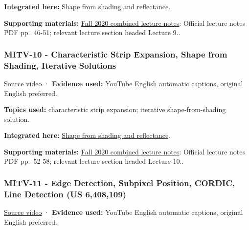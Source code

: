 \textbf{Integrated here:} \hyperref[04-visual-computing-ii-ch032-shape-from-shading-and-reflectance]{Shape from shading and reflectance}.

\textbf{Supporting materials:} \href{https://ocw.mit.edu/courses/6-801-machine-vision-fall-2020/9ec44f69e72995c370b3797818ba01e6_MIT6_801F20_lectureNotes.pdf}{Fall 2020 combined lecture notes}: Official lecture notes PDF pp.~46-51; relevant lecture section headed Lecture 9..

\subsubsection{MITV-10 - Characteristic Strip Expansion, Shape from Shading, Iterative Solutions}\label{04-visual-computing-ii-ch036-mitv-10---characteristic-strip-expansion-shape-from-shading-iterative-solutions}

\hypertarget{04-visual-computing-ii-ch036-mitv-10---characteristic-strip-expansion-shape-from-shading-iterative-solutions}{}

\href{https://www.youtube.com/watch?v=XSUjp-cDyeY}{Source video} · \textbf{Evidence used:} YouTube English automatic captions, original English preferred.

\textbf{Topics used:} characteristic strip expansion; iterative shape-from-shading solution.

\textbf{Integrated here:} \hyperref[04-visual-computing-ii-ch032-shape-from-shading-and-reflectance]{Shape from shading and reflectance}.

\textbf{Supporting materials:} \href{https://ocw.mit.edu/courses/6-801-machine-vision-fall-2020/9ec44f69e72995c370b3797818ba01e6_MIT6_801F20_lectureNotes.pdf}{Fall 2020 combined lecture notes}: Official lecture notes PDF pp.~52-58; relevant lecture section headed Lecture 10..

\subsubsection{MITV-11 - Edge Detection, Subpixel Position, CORDIC, Line Detection (US 6,408,109)}\label{04-visual-computing-ii-ch036-mitv-11---edge-detection-subpixel-position-cordic-line-detection-us-6408109}

\hypertarget{04-visual-computing-ii-ch036-mitv-11---edge-detection-subpixel-position-cordic-line-detection-us-6408109}{}

\href{https://www.youtube.com/watch?v=kjCQ2DUn55Y}{Source video} · \textbf{Evidence used:} YouTube English automatic captions, original English preferred.

